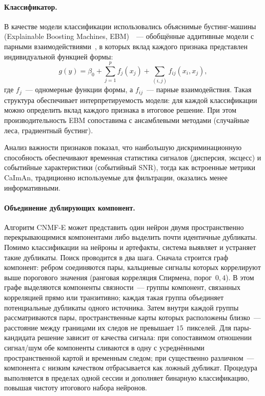 \paragraph{Классификатор.}
В качестве модели классификации использовались объяснимые бустинг-машины (Explainable Boosting Machines, EBM)~\cite{InterpretML-EBM}~--- обобщённые аддитивные модели с парными взаимодействиями~\cite{Lou2013-GA2M}, в которых вклад каждого признака представлен индивидуальной функцией формы:
\begin{equation*}
    g(y) = \beta_0 + \sum_{j=1}^{p} f_j(x_j) + \sum_{(i,j)} f_{ij}(x_i, x_j),
\end{equation*}
где $f_j$~--- одномерные функции формы, а $f_{ij}$~--- парные взаимодействия. Такая структура обеспечивает интерпретируемость модели: для каждой классификации можно определить вклад каждого признака в итоговое решение. При этом производительность EBM сопоставима с ансамблевыми методами (случайные леса, градиентный бустинг).

Анализ важности признаков показал, что наибольшую дискриминационную способность обеспечивают временная статистика сигналов (дисперсия, эксцесс) и событийные характеристики (событийный SNR), тогда как встроенные метрики CaImAn, традиционно используемые для фильтрации, оказались менее информативными.

\paragraph{Объединение дублирующих компонент.}
Алгоритм CNMF-E может представить один нейрон двумя пространственно перекрывающимися компонентами либо выделить почти идентичные дубликаты. Помимо классификации на нейроны и артефакты, система выявляет и устраняет такие дубликаты. Поиск проводится в два шага. Сначала строится граф компонент: ребром соединяются пары, кальциевые сигналы которых коррелируют выше порогового значения (ранговая корреляция Спирмена, порог~$0{,}4$). В этом графе выделяются компоненты связности~--- группы компонент, связанных корреляцией прямо или транзитивно; каждая такая группа объединяет потенциальные дубликаты одного источника. Затем внутри каждой группы рассматриваются пары, пространственные карты которых расположены близко~--- расстояние между границами их следов не превышает $15$~пикселей. Для пары-кандидата решение зависит от качества сигнала: при сопоставимом отношении сигнал/шум обе компоненты сливаются в одну с усреднёнными пространственной картой и временным следом; при существенно различном~--- компонента с низким качеством отбрасывается как ложный дубликат. Процедура выполняется в пределах одной сессии и дополняет бинарную классификацию, повышая чистоту итогового набора нейронов.

